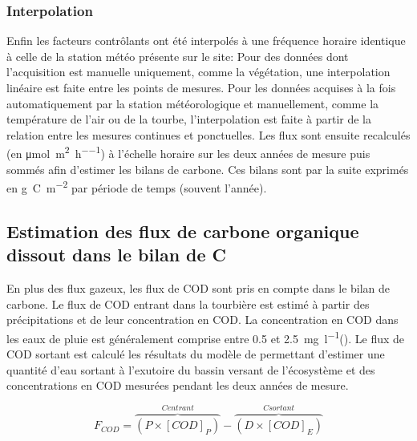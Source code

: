 \subsubsection{Interpolation}

Enfin les facteurs contrôlants ont été interpolés à une fréquence horaire identique à celle de la station météo présente sur le site:
Pour des données dont l'acquisition est manuelle uniquement, comme la végétation, une interpolation linéaire est faite entre les points de mesures.
Pour les données acquises à la fois automatiquement par la station météorologique et manuellement, comme la température de l'air ou de la tourbe, l'interpolation est faite à partir de la relation entre les mesures continues et ponctuelles.
Les flux sont ensuite recalculés (en \si{\micro\mole\per\square\meter\per\hour}) à l'échelle horaire sur les deux années de mesure puis sommés afin d'estimer les bilans de carbone.
Ces bilans sont par la suite exprimés en \si{\gram C m^{-2}} par période de temps (souvent l'année).


\subsection{Estimation des flux de carbone organique dissout dans le bilan de C}

En plus des flux gazeux, les flux de COD sont pris en compte dans le bilan de carbone.
Le flux de COD entrant dans la tourbière est estimé à partir des précipitations et de leur concentration en COD.
La concentration en COD dans les eaux de pluie est généralement comprise entre \num{0.5} et \SI{2.5}{\milli\gram\per\litre}(\citep{sigg2014}).
Le flux de COD sortant est calculé les résultats  du modèle de \citet{binet2013} permettant d'estimer une quantité d'eau sortant à l'exutoire du bassin versant de l'écosystème et des concentrations en COD mesurées pendant les deux années de mesure.

\begin{equation}
\label{eq:COD}
F_{COD} = \overbrace{(P\times[COD]_{P})}^{C entrant}-\overbrace{(D\times[COD]_{E})}^{C sortant}
\end{equation}

